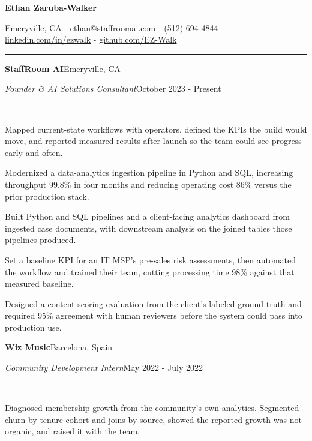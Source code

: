 \documentclass[10pt,letterpaper]{article}
\newenvironment{cvitems}{%
  \begin{list}{-}{%
    \setlength{\leftmargin}{12pt}%
    \setlength{\itemsep}{1.2pt}%
    \setlength{\parsep}{0pt}%
    \setlength{\topsep}{1.5pt}%
    \setlength{\partopsep}{0pt}%
    \setlength{\labelwidth}{6pt}%
    \setlength{\labelsep}{6pt}%
    \setlength{\itemindent}{0pt}%
  }%
}{\end{list}}
\newcommand{\cvsection}[1]{%
  \vspace{7pt}%
  \noindent{\bfseries\fontsize{11pt}{13pt}\selectfont\MakeUppercase{#1}}\par
  \vspace{1pt}%
  \noindent\rule{\textwidth}{0.4pt}\par
  \vspace{4pt}%
}
\newcommand{\cventryhead}[4]{%
  \noindent\textbf{#1}\hfill#2\par
  \vspace{0.5pt}%
  \noindent\textit{#3}\hfill#4\par
}
\begin{document}
\begin{center}
  {\bfseries\fontsize{22pt}{24pt}\selectfont Ethan Zaruba-Walker\par}
  \vspace{4pt}
  {\fontsize{10pt}{12pt}\selectfont
    Emeryville, CA
    {-}
    \href{mailto:ethan@staffroomai.com}{ethan@staffroomai.com}
    {-}
    (512) 694-4844
    {-}
    \href{https://linkedin.com/in/ezwalk}{linkedin.com/in/ezwalk}
    {-}
    \href{https://github.com/EZ-Walk}{github.com/EZ-Walk}\par}
\end{center}
\vspace{2pt}

\cvsection{Experience}

\cventryhead{StaffRoom AI}{Emeryville, CA}
{Founder \& AI Solutions Consultant}{October 2023 - Present}
\begin{cvitems}
  \item Mapped current-state workflows with operators, defined the KPIs the build would move, and reported measured results after launch so the team could see progress early and often.
  \item Modernized a data-analytics ingestion pipeline in Python and SQL, increasing throughput 99.8\% in four months and reducing operating cost 86\% versus the prior production stack.
  \item Built Python and SQL pipelines and a client-facing analytics dashboard from ingested case documents, with downstream analysis on the joined tables those pipelines produced.
  \item Set a baseline KPI for an IT MSP's pre-sales risk assessments, then automated the workflow and trained their team, cutting processing time 98\% against that measured baseline.
  \item Designed a content-scoring evaluation from the client's labeled ground truth and required 95\% agreement with human reviewers before the system could pass into production use.
\end{cvitems}

\vspace{3pt}
\cventryhead{Wiz Music}{Barcelona, Spain}
{Community Development Intern}{May 2022 - July 2022}
\begin{cvitems}
  \item Diagnosed membership growth from the community's own analytics. Segmented churn by tenure cohort and joins by source, showed the reported growth was not organic, and raised it with the team.
\end{cvitems}
\end{document}
